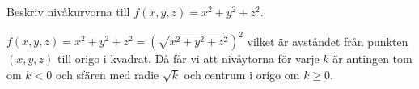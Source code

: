 \documentclass[a4paper]{article}
\begin{document}
\begin{ex}
    Beskriv nivåkurvorna till \(
        f(x,y,z) = x^2+y^2+z^2
    \).

    \(
        f(x,y,z) = x^2+y^2+z^2 = \left(\sqrt{x^2+y^2+z^2}\right)^2 
    \) vilket är avståndet från punkten \(
        (x,y,z)
    \) till origo i kvadrat. Då får vi att nivåytorna för varje \(
        k
    \) är antingen tom om \(
        k < 0
    \) och sfären med radie \(
        \sqrt{k}
    \) och centrum i origo om \(
        k \geq 0
    \).
\end{ex}
\end{document}
